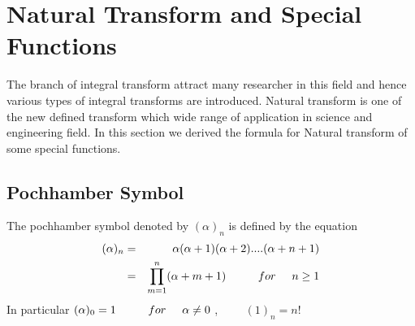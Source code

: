 \newpage
{}
\section{Natural Transform and Special Functions}
The branch of integral transform attract many researcher in this field and hence various types of integral transforms are introduced. Natural transform is one of the new defined transform which wide range of application in science and engineering field. In this section we derived the formula for Natural transform of some special functions.
\subsection{Pochhamber Symbol}
 The pochhamber symbol denoted by $(\alpha)_{n}$ is defined by the equation\cite{R62}
 \begin{eqnarray*}
 (\alpha)_{n}& = &\alpha(\alpha+1)(\alpha+2)....(\alpha+n+1)\\
 & =& \prod_{m = 1}^{n}(\alpha+m+1) {\hspace{1cm}} for{\hspace{0.5cm}} n\geq 1
  \end{eqnarray*}
 In particular $(\alpha)_{0} = 1{\hspace{1cm}} for{\hspace{0.5cm}} \alpha\neq 0$ ,${\hspace{1cm}}(1)_{n} = n! $

